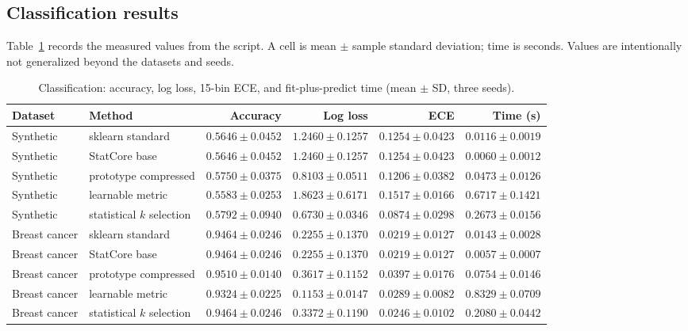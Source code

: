 \documentclass[conference]{IEEEtran}
\begin{document}
\subsection{Classification results}
Table~\ref{tab:class-results} records the measured values from the script. A cell is mean $\pm$ sample standard deviation; time is seconds. Values are intentionally not generalized beyond the datasets and seeds.
\begin{table}[t]
\centering
\small\setlength{\tabcolsep}{3pt}
\caption{Classification: accuracy, log loss, 15-bin ECE, and fit-plus-predict time (mean $\pm$ SD, three seeds).}
\label{tab:class-results}
\begin{tabular}{llrrrr}
\toprule
Dataset & Method & Accuracy & Log loss & ECE & Time (s)\\
\midrule
Synthetic & sklearn standard & $0.5646\pm0.0452$ & $1.2460\pm0.1257$ & $0.1254\pm0.0423$ & $0.0116\pm0.0019$\\
Synthetic & StatCore base & $0.5646\pm0.0452$ & $1.2460\pm0.1257$ & $0.1254\pm0.0423$ & $0.0060\pm0.0012$\\
Synthetic & prototype compressed & $0.5750\pm0.0375$ & $0.8103\pm0.0511$ & $0.1206\pm0.0382$ & $0.0473\pm0.0126$\\
Synthetic & learnable metric & $0.5583\pm0.0253$ & $1.8623\pm0.6171$ & $0.1517\pm0.0166$ & $0.6717\pm0.1421$\\
Synthetic & statistical $k$ selection & $0.5792\pm0.0940$ & $0.6730\pm0.0346$ & $0.0874\pm0.0298$ & $0.2673\pm0.0156$\\
Breast cancer & sklearn standard & $0.9464\pm0.0246$ & $0.2255\pm0.1370$ & $0.0219\pm0.0127$ & $0.0143\pm0.0028$\\
Breast cancer & StatCore base & $0.9464\pm0.0246$ & $0.2255\pm0.1370$ & $0.0219\pm0.0127$ & $0.0057\pm0.0007$\\
Breast cancer & prototype compressed & $0.9510\pm0.0140$ & $0.3617\pm0.1152$ & $0.0397\pm0.0176$ & $0.0754\pm0.0146$\\
Breast cancer & learnable metric & $0.9324\pm0.0225$ & $0.1153\pm0.0147$ & $0.0289\pm0.0082$ & $0.8329\pm0.0709$\\
Breast cancer & statistical $k$ selection & $0.9464\pm0.0246$ & $0.3372\pm0.1190$ & $0.0246\pm0.0102$ & $0.2080\pm0.0442$\\
\bottomrule
\end{tabular}
\end{table}
\end{document}
